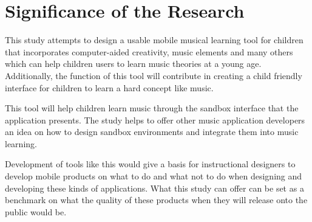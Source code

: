 \section{Significance of the Research}
\label{sec:significance}

This study attempts to design a usable mobile musical learning tool for children that incorporates computer-aided creativity, music elements and many others which can help children users to learn music theories at a young age. Additionally, the function of this tool will contribute in creating a child friendly interface for children to learn a hard concept like music. 

This tool will help children learn music through the sandbox interface that the application presents. The study helps to offer other music application developers an idea on how to design sandbox environments and integrate them into music learning.

Development of tools like this would give a basis for instructional designers to develop mobile products on what to do and what not to do when designing and developing these kinds of applications. What this study can offer can be set as a benchmark on what the quality of these products when they will release onto the public would be.

%
%



